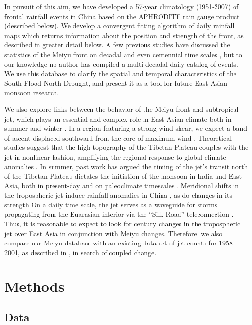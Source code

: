 \documentclass[draft,grl]{AGUTeX}
\begin{document}
\begin{article}
	In pursuit of this aim, we have developed a 57-year climatology (1951-2007) of frontal rainfall events in China based on the APHRODITE rain gauge product (described below). We develop a convergent fitting algorithm of daily rainfall maps which returns information about the position and strength of the front, as described in greater detail below. A few previous studies have discussed the statistics of the Meiyu front on decadal and even centennial time scales \citep{Chen2004,Ge2008,Xu2009}, but to our knowledge no author has compiled a multi-decadal daily catalog of events. We use this database to clarify the spatial and temporal characteristics of the South Flood-North Drought, and present it as a tool for future East Asian monsoon research.
		
	We also explore links between the behavior of the Meiyu front and subtropical jet, which plays an essential and complex role in East Asian climate both in summer and winter \citep{Yang2002}. In a region featuring a strong wind shear, we expect a band of ascent displaced southward from the core of maximum wind \citep{Holton2004}. Theoretical studies suggest that the high topography of the Tibetan Plateau couples with the jet in nonlinear fashion, amplifying the regional response to global climate anomalies \citep{Nigam1989,Broccoli1992,Park1997}. In summer, past work has argued the timing of the jet's transit north of the Tibetan Plateau dictates the initiation of the monsoon in India and East Asia, both in present-day \citep{Yin1949,Hahn1975,Yeh1959} and on paleoclimate timescales \citep{Nagashima2011,Nagashima2013,Chiang2015}. Meridional shifts in the tropospheric jet induce rainfall anomalies in China \citep{Liang1998}, as do changes in its strength \citep{Kwon2007,Du2009,Li2014} On a daily time scale, the jet serves as a waveguide for storms propagating from the Euarasian interior via the ``Silk Road'' teleconnection \citep{Hoskins1993,Ambrizzi1997,Kosaka2012}. Thus, it is reasonable to expect to look for  century changes in the tropospheric jet over East Asia in conjunction with Meiyu changes. Therefore, we also compare our Meiyu database with an existing data set of jet counts for 1958-2001, as described in \citet{Schiemann2009}, in search of coupled change.
	
\section{Methods}

\subsection{Data}


\end{article}
\end{document}
